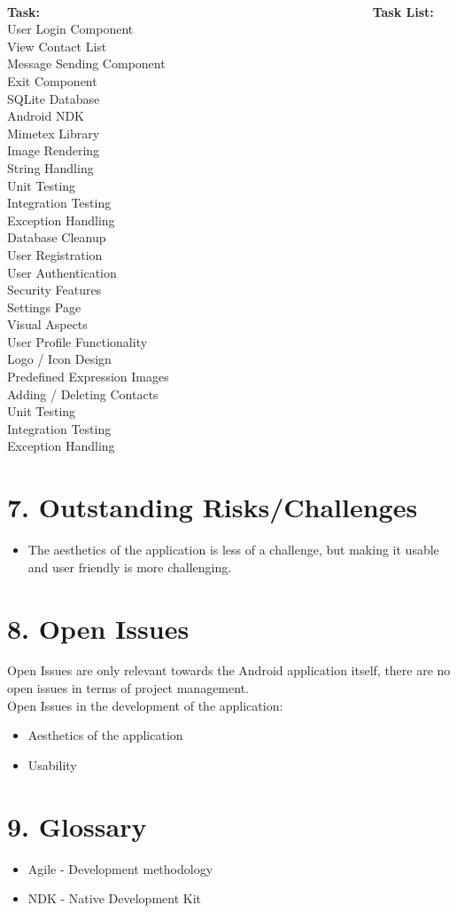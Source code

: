 \documentclass[29pt,a4paper]{moderncv}
\begin{document}
\newpage
\begin{tabbing}
\\\textbf{Task:} ~~~~~~~~~~~~~~~~~~~~~~~~~~~~~~~~~~~~~~~~~~~~~~~~~~~~~\= \textbf{Task List:}\\
User Login Component \\
View Contact List	 \\
Message Sending Component	 \\
Exit Component	 \\
SQLite Database	 \\
Android NDK	 \\
Mimetex Library	 \\
Image Rendering	 \\
String Handling \\
Unit Testing	 \\
Integration Testing	 \\
Exception Handling \\
Database Cleanup	 \\
User Registration	 \\
User Authentication	 \\
Security Features	\\
Settings Page	 \\
Visual Aspects	 \\
User Profile Functionality \\
Logo / Icon Design	 \\
Predefined Expression Images \\
Adding / Deleting Contacts \\
Unit Testing	 \\
Integration Testing	 \\
Exception Handling	 \\
\end{tabbing}

\newpage
		\section*{7. Outstanding Risks/Challenges}
		\begin{itemize}
			\item The aesthetics of the application is less of a challenge, but making it usable and user friendly is more challenging.
			
		\end{itemize}
\newpage		
		\section*{8. Open Issues}
		Open Issues are only relevant towards the Android application itself, there are no open issues in terms of project management.\\
		Open Issues in the development of the application:
				\begin{itemize}
					\item Aesthetics of the application
					\item Usability
				\end{itemize}	
\newpage
		\section*{9. Glossary}
		\begin{itemize}
			\item Agile - Development methodology
			\item NDK - Native Development Kit
		\end{itemize}
\end{document}
